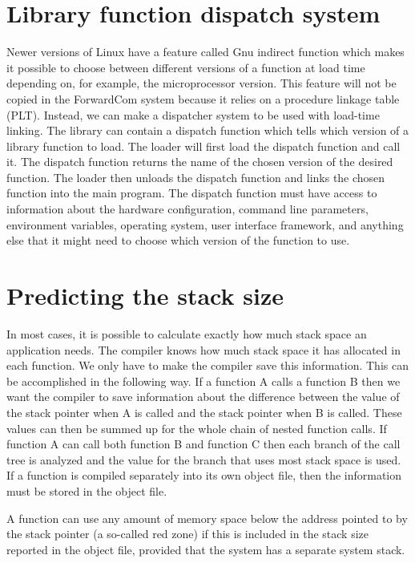 \documentclass[forwardcom.tex]{subfiles}
\begin{document}
\section{Library function dispatch system} \label{libraryFunctionDispatchSystem}
Newer versions of Linux have a feature called Gnu indirect function which makes it possible to choose between different versions of a function at load time depending on, for example, the microprocessor version. This feature will not be copied in the ForwardCom system because it relies on a procedure linkage table (PLT). Instead, we can make a dispatcher system to be used with load-time linking. The library can contain a dispatch function which tells which version of a library function to load. The loader will first load the dispatch function and call it. The dispatch function returns the name of the chosen version of the desired function. The loader then unloads the dispatch function and links the chosen function into the main program. The dispatch function must have access to information about the hardware configuration, command line parameters, environment variables, operating system, user interface framework, and anything else that it might need to choose which version of the function to use.

\section{Predicting the stack size} \label{predictingStackSize}
In most cases, it is possible to calculate exactly how much stack space an application needs. The compiler knows how much stack space it has allocated in each function. We only have to make the compiler save this information. This can be accomplished in the following way. If a function A calls a function B then we want the compiler to save information about the difference between the value of the stack pointer when A is called and the stack pointer when B is called. These values can then be summed up for the whole chain of nested function calls. If function A can call both function B and function C then each branch of the call tree is analyzed and the value for the branch that uses most stack space is used. If a function is compiled separately into its own object file, then the information must be stored in the object file. 
\vspace{2mm}

A function can use any amount of memory space below the address pointed to by the stack pointer (a so-called red zone) if this is included in the stack size reported in the object file, provided that the system has a separate system stack. 
\vspace{2mm}
\end{document}
